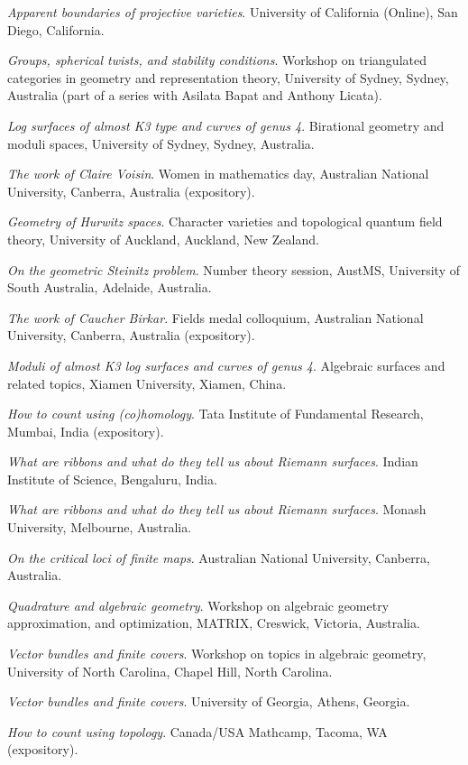 \documentclass[11pt]{article}
\begin{document}
\begin{description}
\emph{Apparent boundaries of projective varieties}.
University of California (Online), San Diego, California.
\item[{2019}] \emph{Groups, spherical twists, and stability conditions}.
Workshop on triangulated categories in geometry and representation theory, University of Sydney, Sydney, Australia (part of a series with Asilata Bapat and Anthony Licata).

\emph{Log surfaces of almost K3 type and curves of genus 4}.
Birational geometry and moduli spaces, University of Sydney, Sydney, Australia.

\emph{The work of Claire Voisin}.
Women in mathematics day, Australian National University, Canberra, Australia (expository).
\item[{2018}] \emph{Geometry of Hurwitz spaces}.
Character varieties and topological quantum field theory, University of Auckland, Auckland, New Zealand.

\emph{On the geometric Steinitz problem}.
Number theory session,  AustMS, University of South Australia, Adelaide, Australia.

\emph{The work of Caucher Birkar}.
Fields medal colloquium, Australian National University, Canberra, Australia (expository).

\emph{Moduli of almost K3 log surfaces and curves of genus 4}.
Algebraic surfaces and related topics, Xiamen University, Xiamen, China.

\emph{How to count using (co)homology}.
Tata Institute of Fundamental Research, Mumbai, India (expository).

\emph{What are ribbons and what do they tell us about Riemann surfaces}.
Indian Institute of Science, Bengaluru, India.

\emph{What are ribbons and what do they tell us about Riemann surfaces}.
Monash University, Melbourne, Australia.

\emph{On the critical loci of finite maps}.
Australian National University, Canberra, Australia.

\emph{Quadrature and algebraic geometry}.
Workshop on algebraic geometry approximation, and optimization, MATRIX, Creswick, Victoria, Australia.
\item[{2017}] \emph{Vector bundles and finite covers}.
Workshop on topics in algebraic geometry, University of North Carolina, Chapel Hill, North Carolina.

\emph{Vector bundles and finite covers}.
University of Georgia, Athens, Georgia.

\emph{How to count using topology}.
Canada/USA Mathcamp, Tacoma, WA (expository).


\end{description}
\end{document}
